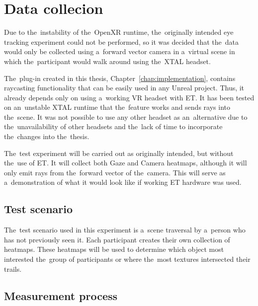 \pagebreak{}

\section{Data collecion}
\label{sec:data-collection}

Due to the~instability of the~OpenXR runtime, the~originally intended eye tracking experiment could not be performed, so it was decided that the~data would only be collected using a~forward vector camera in a~virtual scene in which the~participant would walk around using the~XTAL headset. 

The~plug-in created in this thesis, Chapter~\ref{chap:implementation}, contains raycasting functionality that can be easily used in any Unreal project. Thus, it already depends only on using a~working VR headset with ET. It has been tested on an~unstable XTAL runtime that the~feature works and sends rays into the~scene. It was not possible to use any other headset as an~alternative due to the~unavailability of other headsets and the~lack of time to incorporate the~changes into the~thesis.

The~test experiment will be carried out as originally intended, but without the~use of ET. It will collect both Gaze and Camera heatmaps, although it will only emit rays from the~forward vector of the~camera. This will serve as a~demonstration of what it would look like if working ET hardware was used.

\subsection{Test scenario}

The~test scenario used in this experiment is a~scene traversal by a~person who has not previously seen it. Each participant creates their own collection of heatmaps. These heatmaps will be used to determine which object most interested the~group of participants or where the~most textures intersected their trails.

\subsection{Measurement process}

